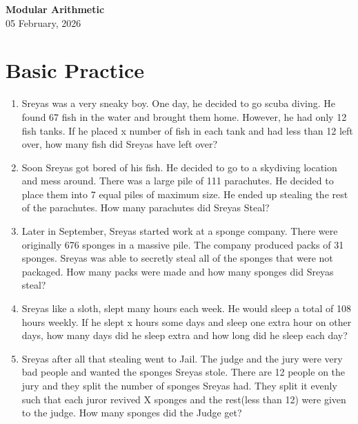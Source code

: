 \documentclass[a4paper]{article}
\begin{document}
\begin{center}
{\Large\bfseries Modular Arithmetic}\\[0.25cm]
{\large 05 February, 2026}\\[1cm]
\end{center}

\section{Basic Practice}
\begin{enumerate}[itemsep=2.85cm]
    \item Sreyas was a very sneaky boy. One day, he decided to go scuba diving. He found 67 fish in the water and brought them home. However, he had only 12 fish tanks. If he placed x number of fish in each tank and had less than 12 left over, how many fish did Sreyas have left over?
    \item Soon Sreyas got bored of his fish. He decided to go to a skydiving location and mess around. There was a large pile of 111 parachutes. He decided to place them into 7 equal piles of maximum size. He ended up stealing the rest of the parachutes. How many parachutes did Sreyas Steal?
    \item Later in September, Sreyas started work at a sponge company. There were originally 676 sponges in a massive pile. The company produced packs of 31 sponges. Sreyas was able to secretly steal all of the sponges that were not packaged. How many packs were made and how many sponges did Sreyas steal?
    \item Sreyas like a sloth, slept many hours each week. He would sleep a total of 108 hours weekly. If he slept x hours some days and sleep one extra hour on other days, how many days did he sleep extra and how long did he sleep each day?
    \item Sreyas after all that stealing went to Jail. The judge and the jury were very bad people and wanted the sponges Sreyas stole. There are 12 people on the jury and they split the number of sponges Sreyas had. They split it evenly such that each juror revived X sponges and the rest(less than 12) were given to the judge. How many sponges did the Judge get?
    
    
\end{enumerate}
\newpage
\end{document}

